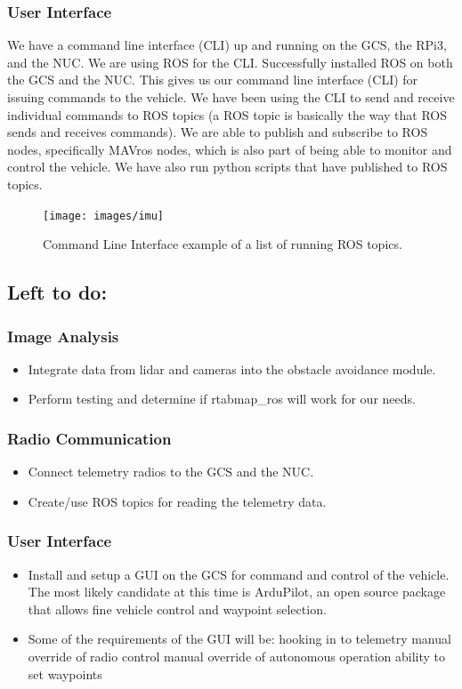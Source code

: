 \documentclass[compsoc,draftclsnofoot,onecolumn,10pt]{IEEEtran}
\begin{document}
\begin{itemize}
\subsubsection{User Interface}
We have a command line interface (CLI) up and running on the GCS, the RPi3, and the NUC. We are using ROS for the CLI. 
Successfully installed ROS on both the GCS and the NUC. This gives us our command line interface (CLI) for issuing commands to the vehicle. We have been using the CLI to send and receive individual commands to ROS topics (a ROS topic is basically the way that ROS sends and receives commands). We are able to publish and subscribe to ROS nodes, specifically MAVros nodes, which is also part of being able to monitor and control the vehicle. We have also run python scripts that have published to ROS topics.\par

\begin{figure}[H]
	\texttt{[image: images/imu]}
	\caption{Command Line Interface example of a list of running ROS topics.}
\end{figure}



\subsection{Left to do:}
\subsubsection{Image Analysis}
\begin{itemize}
	\item Integrate data from lidar and cameras into the obstacle avoidance module.
	\item Perform testing and determine if rtabmap\_ros will work for our needs.
\end{itemize}

\subsubsection{Radio Communication}
\begin{itemize}
	\item Connect telemetry radios to the GCS and the NUC.
	\item Create/use ROS topics for reading the telemetry data.
\end{itemize}

\subsubsection{User Interface}
\begin{itemize}
	\item Install and setup a GUI on the GCS for command and control of the vehicle. The most likely candidate at this time is ArduPilot, an open source package that allows fine vehicle control and waypoint selection.
	\item Some of the requirements of the GUI will be:
	\subitem hooking in to telemetry
	\subitem manual override of radio control
	\subitem manual override of autonomous operation
	\subitem ability to set waypoints
	

\end{itemize}
\end{itemize}
\end{document}
